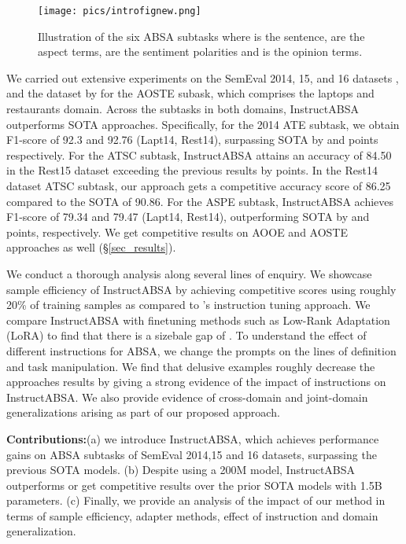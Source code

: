 \documentclass[11pt]{article}
\newcommand{\name}{\textsc{I}nstruct\textsc{ABSA}\xspace}
\begin{document}
\begin{figure}[t!]
	\centering
	\texttt{[image: pics/introfignew.png]}
	\caption{Illustration of the six ABSA subtasks where  is the  sentence,  are the aspect terms,  are the sentiment polarities and  is the opinion terms.}
	\label{fig:teaser}
\end{figure} 



 We carried out extensive experiments on the SemEval 2014, 15, and 16 datasets \cite{pontiki-etal-2014-semeval,Pontiki2015SemEval2015T1,Pontiki2016SemEval2016T5}, and the dataset by \cite{Peng_Xu_Bing_Huang_Lu_Si_2020} for the AOSTE subask, which comprises the laptops and restaurants domain. 
 Across the subtasks in both domains, \name{} outperforms SOTA approaches. 
Specifically, for the 2014 ATE subtask, we obtain F1-score of 92.3 and 92.76 (Lapt14, Rest14), surpassing SOTA by  and  points respectively.
For the ATSC subtask, \name{} attains an accuracy of 84.50 in the Rest15 dataset exceeding the previous results by  points. 
In the Rest14 dataset ATSC subtask, our approach gets a competitive accuracy score of 86.25 compared to the SOTA of 90.86.
For the ASPE subtask, \name{} achieves F1-score of 79.34 and 79.47 (Lapt14, Rest14), outperforming SOTA by  and  points, respectively.
We get competitive results on AOOE and AOSTE approaches as well (\S \ref{sec_results}). 

We conduct a thorough analysis along several lines of enquiry. 
We showcase sample efficiency of \name{} by achieving competitive scores using roughly 20\% of training samples as compared to \citet{varia2023instruction}'s instruction tuning approach.
We compare \name{} with finetuning methods such as Low-Rank Adaptation (LoRA) \cite{hu2021lora} to find that there is a sizebale gap of .
To understand the effect of different instructions for ABSA, we change the prompts on the lines of definition and task manipulation. 
We find that delusive examples roughly decrease the approaches results by  giving a strong evidence of the impact of instructions on \name{}.
We also provide evidence of cross-domain and joint-domain generalizations arising as part of our proposed approach. 

\noindent\textbf{Contributions:}(a) we introduce \name{}, which achieves performance gains on ABSA subtasks of SemEval 2014,15 and 16 datasets, surpassing the previous SOTA models. 
(b) Despite using a 200M model, \name{} outperforms or get competitive results over the prior SOTA models with 1.5B parameters. 
(c) Finally, we provide an analysis of the impact of our method in terms of sample efficiency, adapter methods, effect of instruction and domain generalization.
\end{document}
